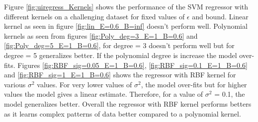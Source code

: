 Figure \ref{fig:uiregress_Kernels} shows the performance of the SVM regressor with different kernels on a challenging dataset for fixed values of $\epsilon$ and bound. Linear kernel as seen in figure \ref{fig:lin_E=0.6_B=inf} doesn't perform well. Polynomial kernels as seen from figures \ref{fig:Poly_deg=3_E=1_B=0.6} and \ref{fig:Poly_deg=5_E=1_B=0.6}, for degree = 3 doesn't perform well but for degree = 5 generalizes better. If the polynomial degree is increase the model over-fits. Figures \ref{fig:RBF_sig=0.05_E=1_B=0.6}, \ref{fig:RBF_sig=0.1_E=1_B=0.6} and \ref{fig:RBF_sig=1_E=1_B=0.6} shows the regressor with RBF kernel for various $\sigma^2$ values. For very lower values of $\sigma^2$, the model over-fits but for higher values the model gives a linear estimate. Therefore, for a value of $\sigma^2$ = 0.1, the model generalizes better. Overall the regressor with RBF kernel performs betters as it learns complex patterns of data better compared to a polynomial kernel.
